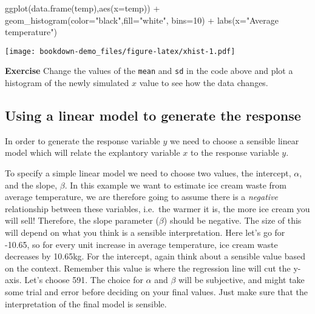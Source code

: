 \documentclass[
]{book}
\newenvironment{Shaded}{\begin{snugshade}}{\end{snugshade}}
\newcommand{\AttributeTok}[1]{\textcolor[rgb]{0.77,0.63,0.00}{#1}}
\newcommand{\DecValTok}[1]{\textcolor[rgb]{0.00,0.00,0.81}{#1}}
\newcommand{\FunctionTok}[1]{\textcolor[rgb]{0.00,0.00,0.00}{#1}}
\newcommand{\NormalTok}[1]{#1}
\newcommand{\SpecialCharTok}[1]{\textcolor[rgb]{0.00,0.00,0.00}{#1}}
\newcommand{\StringTok}[1]{\textcolor[rgb]{0.31,0.60,0.02}{#1}}
\begin{document}
\begin{Shaded}
\begin{Highlighting}[]
\FunctionTok{ggplot}\NormalTok{(}\FunctionTok{data.frame}\NormalTok{(temp),}\FunctionTok{aes}\NormalTok{(}\AttributeTok{x=}\NormalTok{temp)) }\SpecialCharTok{+} 
  \FunctionTok{geom\_histogram}\NormalTok{(}\AttributeTok{color=}\StringTok{"black"}\NormalTok{,}\AttributeTok{fill=}\StringTok{"white"}\NormalTok{, }\AttributeTok{bins=}\DecValTok{10}\NormalTok{) }\SpecialCharTok{+} 
            \FunctionTok{labs}\NormalTok{(}\AttributeTok{x=}\StringTok{"Average temperature"}\NormalTok{)}
\end{Highlighting}
\end{Shaded}

\texttt{[image: bookdown-demo\_files/figure-latex/xhist-1.pdf]}

\textbf{Exercise}
Change the values of the \texttt{mean} and \texttt{sd} in the code above and plot a histogram of the newly simulated \(x\) value to see how the data changes.

\hypertarget{using-a-linear-model-to-generate-the-response}{%
\subsection{Using a linear model to generate the response}\label{using-a-linear-model-to-generate-the-response}}

In order to generate the response variable \(y\) we need to choose a sensible linear model which will relate the explantory variable \(x\) to the response variable \(y\).

To specify a simple linear model we need to choose two values, the intercept, \(\alpha\), and the slope, \(\beta\). In this example we want to estimate ice cream waste from average temperature, we are therefore going to assume there is a \emph{negative} relationship between these variables, i.e.~the warmer it is, the more ice cream you will sell! Therefore, the slope parameter (\(\beta\)) should be negative. The size of this will depend on what you think is a sensible interpretation. Here let's go for -10.65, so for every unit increase in average temperature, ice cream waste decreases by 10.65kg. For the intercept, again think about a sensible value based on the context. Remember this value is where the regression line will cut the y-axis. Let's choose 591. The choice for \(\alpha\) and \(\beta\) will be subjective, and might take some trial and error before deciding on your final values. Just make sure that the interpretation of the final model is sensible.
\end{document}
